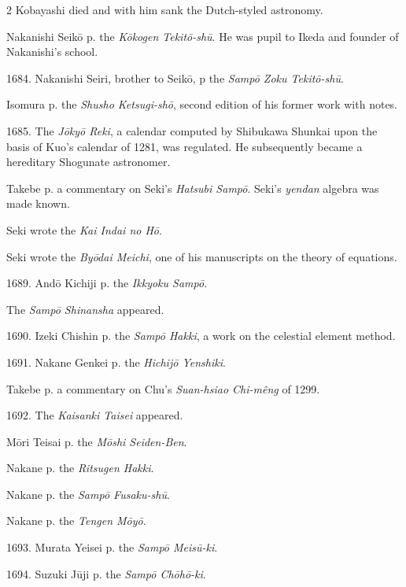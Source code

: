 \documentclass[11pt]{article}
\newcommand{\scanfooter}{}
\begin{document}
\begin{multicols}{2}
Kobayashi died and with him sank the Dutch-styled astronomy.

Nakanishi Seikō p. the \emph{Kōkogen Tekitō-shū}. He was pupil to Ikeda and founder of Nakanishi's school.

1684. Nakanishi Seiri, brother to Seikō, p the \emph{Sampō Zoku Tekitō-shū}.

Isomura p. the \emph{Shusho Ketsugi-shō}, second edition of his former work with notes.

1685. The \emph{Jōkyō Reki}, a calendar computed by Shibukawa Shunkai upon the basis of Kuo's calendar of 1281, was regulated. He subsequently became a hereditary Shogunate astronomer.

Takebe p. a commentary on Seki's \emph{Hatsubi Sampō}. Seki's \emph{yendan} algebra was made known.

Seki wrote the \emph{Kai Indai no Hō}.

Seki wrote the \emph{Byōdai Meichi}, one of his manuscripts on the theory of equations.

1689. Andō Kichiji p. the \emph{Ikkyoku Sampō}.

The \emph{Sampō Shinansha} appeared.

1690. Izeki Chishin p. the \emph{Sampō Hakki}, a work on the celestial element method.

1691. Nakane Genkei p. the \emph{Hichijō Yenshiki}.

Takebe p. a commentary on Chu's \emph{Suan-hsiao Chi-mêng} of 1299.

1692. The \emph{Kaisanki Taisei} appeared.

Mōri Teisai p. the \emph{Mōshi Seiden-Ben}.

Nakane p. the \emph{Ritsugen Hakki}.

Nakane p. the \emph{Sampō Fusaku-shū}.

Nakane p. the \emph{Tengen Mōyō}.

1693. Murata Yeisei p. the \emph{Sampō Meisū-ki}.

1694. Suzuki Jūji p. the \emph{Sampō Chōhō-ki}.
\end{multicols}
\scanfooter
\end{document}

